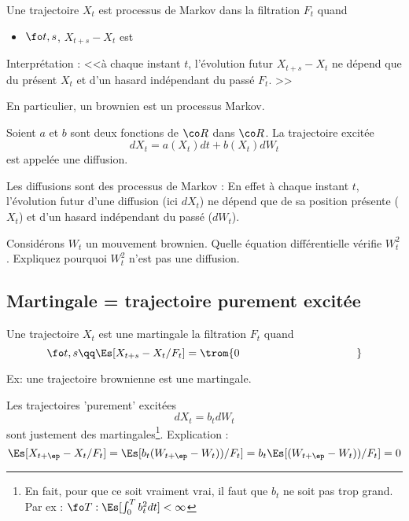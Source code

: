 \documentclass{article}
\begin{document}
Une trajectoire $X_t$ est processus de Markov dans la filtration $F_t$ quand
\begin{itemize}
\item $\fo t,s$,   $X_{t+s}-X_t$ est  
\end{itemize}
Interprétation : <<à chaque instant $t$, l'évolution futur   $X_{t+s}-X_t$  ne dépend que du présent $X_t$ et d'un hasard indépendant du  passé $F_t$. >>


En particulier, un brownien est un processus Markov.  


\begin{definition} Soient $a$ et $b$ sont deux fonctions de $\co R$ dans $\co R$. La trajectoire excitée  
$$
dX_t= a(X_t) dt + b(X_t) dW_t
$$
est  appelée une diffusion.
\end {definition}

 Les diffusions sont des processus de Markov : En effet à chaque instant $t$, l'évolution futur d'une diffusion (ici $ dX_t$) ne dépend que de sa position présente ($X_t$) et d'un hasard indépendant du passé ($dW_t$).


\begin{exo}  Considérons $W_t$ un mouvement brownien. Quelle équation différentielle vérifie $W^2_t$.  Expliquez pourquoi $W^2_t$ n'est pas une diffusion. 
\end{exo}




\begin{grostro}

\vspace{5cm}

\end{grostro}


\subsection{Martingale = trajectoire purement excitée}

Une trajectoire $X_t$ est une martingale la filtration $F_t$ quand
$$
\fo t,s \qq \Es[ X_{t+s}-X_t   /  F_t  ] = \trom{ 0   \ \  \ \ \  \ \ \    \ \  \ \ \  \ \ \    \ \  \ \ \  \ \ \    \ \  \ \ \  \ \ \   }
$$


Ex: une trajectoire brownienne est une martingale.   


Les trajectoires 'purement' excitées 
$$
dX_t = b_t  dW_t
$$
sont justement des martingales\footnote{En fait, pour que ce soit vraiment vrai, il faut que $b_t$ ne soit pas trop grand. Par ex : $\fo T:\Es[\int_0^T b^2_t dt ]<\infty$}.  Explication :
$$
\Es[ X_{t+\ep}-X_t / F_t] = \Es[ b_t (W_{t+\ep}-W_t)) / F_t] = b_t \Es[ (W_{t+\ep}-W_t)) / F_t]  = 0 
$$
\end{document}
